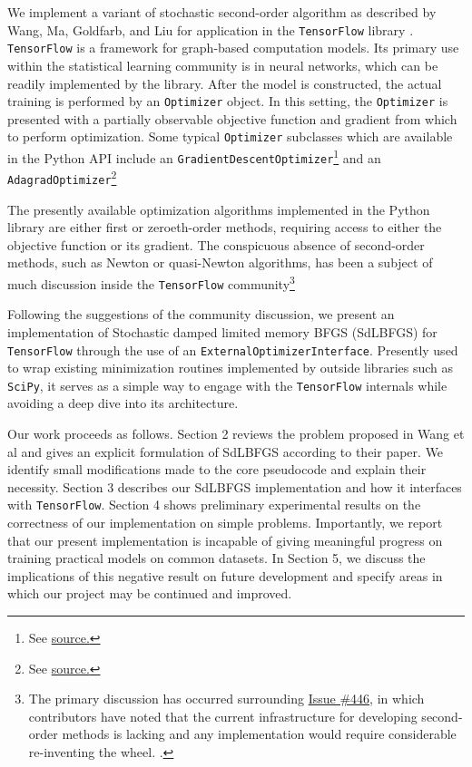 \documentclass{article}
\begin{document}
We implement a variant of stochastic second-order algorithm as described by
Wang, Ma, Goldfarb, and Liu \cite{sdlbfgs} for application in the
\texttt{TensorFlow} library \cite{tensorflow}.  \texttt{TensorFlow} is a
framework for graph-based computation models. Its primary use within the
statistical learning community is in neural networks, which can be readily
implemented by the library. After the model is constructed, the actual training
is performed by an \texttt{Optimizer} object. In this setting, the
\texttt{Optimizer} is presented with a partially observable objective function
and gradient from which to perform optimization. Some typical \texttt{Optimizer}
subclasses which are available in the Python API include
an \texttt{GradientDescentOptimizer}\footnote{%
  See
  \href{https://github.com/tensorflow/tensorflow/blob/master/tensorflow/python/training/gradient_descent.py}{source.}
}%
and an \texttt{AdagradOptimizer}\footnote{%
  See \href{https://github.com/tensorflow/tensorflow/blob/master/tensorflow/python/training/adagrad.py}{source.}
}%

The presently available optimization algorithms implemented in the Python
library are either first or zeroeth-order methods, requiring access to either
the objective function or its gradient. The conspicuous absence of second-order
methods, such as Newton or quasi-Newton algorithms, has been a subject of much
discussion inside the \texttt{TensorFlow} community\footnote{%
  The primary discussion has occurred surrounding
  \href{https://github.com/tensorflow/tensorflow/issues/446}{Issue \#446}, in
  which contributors have noted that the current infrastructure for developing
  second-order methods is lacking and any implementation would require
  considerable re-inventing the wheel.
.}

Following the suggestions of the community discussion, we present an
implementation of Stochastic damped limited memory BFGS (SdLBFGS) for
\texttt{TensorFlow} through the use of an \texttt{ExternalOptimizerInterface}.
Presently used to wrap existing minimization routines implemented by outside
libraries such as \texttt{SciPy}, it serves as a simple way to engage with the
\texttt{TensorFlow} internals while avoiding a deep dive into its architecture.

Our work proceeds as follows. Section 2 reviews the problem proposed in Wang et
al and gives an explicit formulation of SdLBFGS according to their paper. We
identify small modifications made to the core pseudocode and explain their
necessity. Section 3 describes our SdLBFGS implementation and how it interfaces
with \texttt{TensorFlow}. Section 4 shows preliminary experimental results on
the correctness of our implementation on simple problems. Importantly, we report
that our present implementation is incapable of giving meaningful progress on
training practical models on common datasets. In Section 5, we discuss the
implications of this negative result on future development and specify areas in
which our project may be continued and improved.
\end{document}
